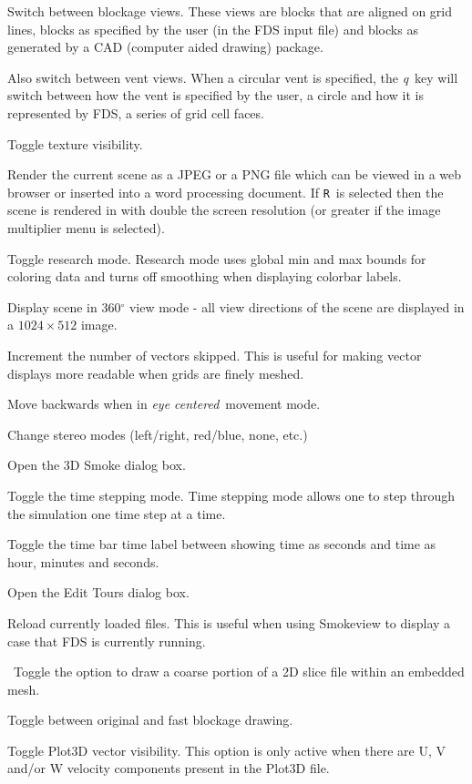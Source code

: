 \documentclass[11pt,twoside]{book}
\newcommand{\kitem}[1]{\item[{\bf {\tt #1 \  }} \hfill]}
\begin{document}
\kitem{q}Switch between blockage views.  These views are blocks
that are aligned on grid lines, blocks as specified by the user
(in the FDS input file) and blocks as generated by a CAD (computer
aided drawing) package.

Also switch between vent views.  When a circular vent is specified,
the {\em q}\ key will switch between how the vent is specified by the user, a circle
and how it is represented by FDS, a series of grid cell faces.

\kitem{Q}Toggle texture visibility.

\kitem{r,R}Render the current scene as a JPEG or a PNG file which
can be viewed in a web browser or inserted into a word processing
document.  If {\tt R}\ is selected then the
scene is rendered in with double the screen resolution (or greater if the image multiplier menu is selected).

\kitem{ALT r}Toggle research mode.  Research mode uses global min
and max bounds for coloring data and turns off smoothing when displaying colorbar labels.

\kitem{ALT R}Display scene in 360$^\circ$ view mode - all view directions of the scene are displayed in a $1024\times 512$ image.

\kitem{s}Increment the number of vectors skipped. This is useful
for making vector displays more readable when grids are finely
meshed.

\kitem{s}Move backwards when in {\em eye centered}\ movement mode.

\kitem{S}Change stereo modes (left/right, red/blue, none, etc.)

\kitem{ALT s}Open the 3D Smoke dialog box.

\kitem{t}Toggle the time stepping mode.  Time stepping mode allows
one to step through the simulation one time step at a time.

\kitem{T}Toggle the time bar time label between showing time as seconds
and time as hour, minutes and seconds.

\kitem{ALT t}Open the Edit Tours dialog box.

\kitem{u}Reload currently loaded files.  This is useful when
using Smokeview to display a case that FDS is currently running.

\kitem{ALT u}\ Toggle the option to draw a coarse portion of a 2D
slice file within an embedded mesh.

\kitem{U}Toggle between original and fast blockage drawing.

\kitem{v}Toggle Plot3D vector visibility.  This option is only active
when there are U, V and/or W velocity components present in the
Plot3D file.
\end{document}
